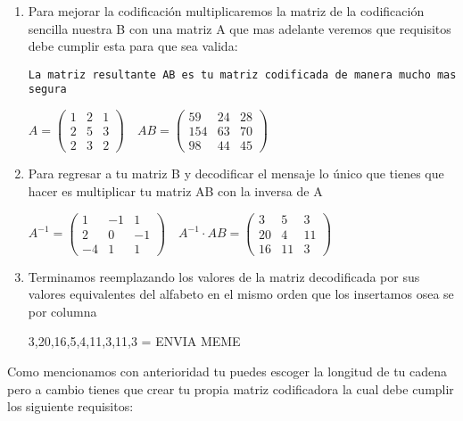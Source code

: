 \documentclass[12pt,letterpaper]{report}
\begin{document}
\begin{enumerate}
\begin{center}
\end{center}

\item Para mejorar la codificación multiplicaremos la matriz de la codificación sencilla nuestra B con una matriz A que mas adelante veremos que requisitos debe cumplir esta para que sea valida:

\texttt{La matriz resultante AB es tu matriz codificada de manera mucho mas segura}

\begin{center}
$A =
\begin{pmatrix}
1 & 2 & 1\\
2 & 5 & 3\\
2 & 3 & 2
\end{pmatrix}
\quad
AB = 
\begin{pmatrix}
59 & 24 & 28\\
154 & 63 & 70\\
98 & 44 & 45
\end{pmatrix}
$
\end{center}

\item Para regresar a tu matriz B y decodificar el mensaje lo único que tienes que hacer es multiplicar tu matriz AB con la inversa de A

\begin{center}
$A^{-1} =
\begin{pmatrix}
1 & -1 & 1\\
2 & 0 & -1\\
-4 & 1 & 1
\end{pmatrix}
\quad
A^{-1} \cdot AB = 
\begin{pmatrix}
3 & 5 & 3\\
20 & 4 & 11\\
16 & 11 & 3
\end{pmatrix}
$
\end{center}

\item Terminamos reemplazando los valores de la matriz decodificada por sus valores equivalentes del alfabeto en el mismo orden que los insertamos osea se por columna 

\begin{center}
3,20,16,5,4,11,3,11,3 = ENVIA MEME
\end{center}

\end{enumerate}

Como mencionamos con anterioridad tu puedes escoger la longitud de tu cadena pero a cambio tienes que crear tu propia matriz codificadora la cual debe cumplir los siguiente requisitos:
\end{document}
